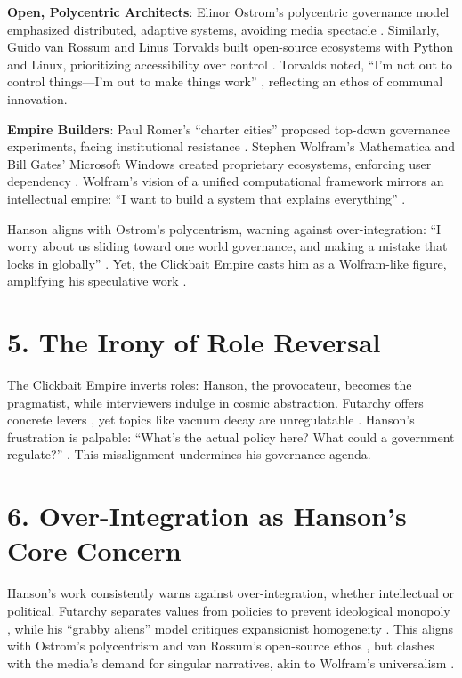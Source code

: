 \documentclass[11pt]{article}
\begin{document}
\textbf{Open, Polycentric Architects}: Elinor Ostrom’s polycentric governance model emphasized distributed, adaptive systems, avoiding media spectacle \citep{ostrom1990}. Similarly, Guido van Rossum and Linus Torvalds built open-source ecosystems with Python and Linux, prioritizing accessibility over control \citep{vanrossum1991,torvalds1999}. Torvalds noted, ``I’m not out to control things---I’m out to make things work'' \citep{torvalds1999}, reflecting an ethos of communal innovation.

\textbf{Empire Builders}: Paul Romer’s ``charter cities'' proposed top-down governance experiments, facing institutional resistance \citep{romer2010}. Stephen Wolfram’s Mathematica and Bill Gates’ Microsoft Windows created proprietary ecosystems, enforcing user dependency \citep{wolfram2002,gates1995}. Wolfram’s vision of a unified computational framework mirrors an intellectual empire: ``I want to build a system that explains everything'' \citep{wolfram2002}.

Hanson aligns with Ostrom’s polycentrism, warning against over-integration: ``I worry about us sliding toward one world governance, and making a mistake that locks in globally'' \citep{hansonstone2025}. Yet, the Clickbait Empire casts him as a Wolfram-like figure, amplifying his speculative work \citep{hanson2021a,bbc2021}.

\section*{5. The Irony of Role Reversal}

The Clickbait Empire inverts roles: Hanson, the provocateur, becomes the pragmatist, while interviewers indulge in cosmic abstraction. Futarchy offers concrete levers \citep{Hanson2013-HANSWV}, yet topics like vacuum decay are unregulatable \citep{hansonstone2025,stone2025}. Hanson’s frustration is palpable: ``What’s the actual policy here? What could a government regulate?'' \citep{hansonstone2025}. This misalignment undermines his governance agenda.

\section*{6. Over-Integration as Hanson’s Core Concern}

Hanson’s work consistently warns against over-integration, whether intellectual or political. Futarchy separates values from policies to prevent ideological monopoly \citep{Hanson2013-HANSWV}, while his ``grabby aliens'' model critiques expansionist homogeneity \citep{hanson2021a}. This aligns with Ostrom’s polycentrism \citep{ostrom1990} and van Rossum’s open-source ethos \citep{vanrossum1991}, but clashes with the media’s demand for singular narratives, akin to Wolfram’s universalism \citep{wolfram2002}.
\end{document}

